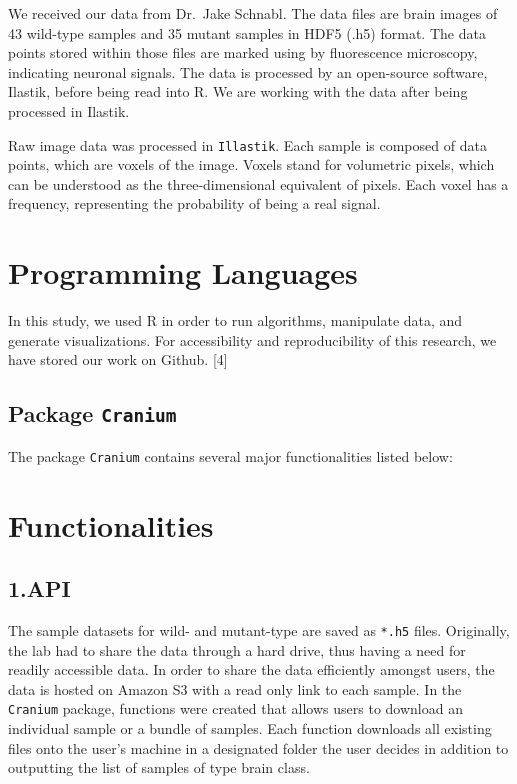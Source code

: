 \documentclass[10pt,letterpaper]{article}
\begin{document}
We received our data from Dr.~Jake Schnabl. The data files are brain
images of 43 wild-type samples and 35 mutant samples in HDF5 (.h5)
format. The data points stored within those files are marked using by
fluorescence microscopy, indicating neuronal signals. The data is
processed by an open-source software, Ilastik, before being read into R.
We are working with the data after being processed in Ilastik.

Raw image data was processed in \texttt{Illastik}. Each sample is
composed of data points, which are voxels of the image. Voxels stand for
volumetric pixels, which can be understood as the three-dimensional
equivalent of pixels. Each voxel has a frequency, representing the
probability of being a real signal.

\hypertarget{programming-languages}{%
\section{Programming Languages}\label{programming-languages}}

In this study, we used R in order to run algorithms, manipulate data,
and generate visualizations. For accessibility and reproducibility of
this research, we have stored our work on Github. {[}4{]}

\hypertarget{package-cranium}{%
\subsection{\texorpdfstring{Package
\texttt{Cranium}}{Package Cranium}}\label{package-cranium}}

The package \texttt{Cranium} contains several major functionalities
listed below:

\hypertarget{functionalities}{%
\section{Functionalities}\label{functionalities}}

\hypertarget{api}{%
\subsection{1.API}\label{api}}

The sample datasets for wild- and mutant-type are saved as \texttt{*.h5}
files. Originally, the lab had to share the data through a hard drive,
thus having a need for readily accessible data. In order to share the
data efficiently amongst users, the data is hosted on Amazon S3 with a
read only link to each sample. In the \texttt{Cranium} package,
functions were created that allows users to download an individual
sample or a bundle of samples. Each function downloads all existing
files onto the user's machine in a designated folder the user decides in
addition to outputting the list of samples of type brain class.
\end{document}
